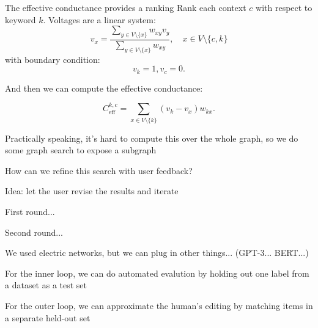 \documentclass[12pt]{beamer}
\begin{document}
\begin{frame}{The effective conductance provides a ranking}
  Rank each context $c$ with respect to keyword $k$. Voltages are a linear system:
  \begin{equation}
    v_x = \frac{\sum_{y \in V\setminus \{x\}} w_{xy}v_y}{\sum_{y \in V\setminus \{x\}} w_{xy}}, \quad x \in V \setminus \{c, k\}
  \end{equation}
  with boundary condition:
  \begin{equation}
    v_k = 1, v_c = 0.
  \end{equation}

  And then we can compute the effective conductance:
  
  \begin{equation}
    C_{\textrm{eff}}^{k,c} = \sum_{x \in V \setminus \{k\}} (v_k - v_x) w_{kx}.
  \end{equation}
\end{frame}

\begin{frame}{}
  Practically speaking, it's hard to compute this over the whole graph, so we do some graph search to expose a subgraph
\end{frame}

\begin{frame}{}
  How can we refine this search with user feedback?
\end{frame}

\begin{frame}{}
  Idea: let the user revise the results and iterate
\end{frame}

\begin{frame}{}
  First round...
\end{frame}

\begin{frame}{}
  Second round...
\end{frame}

\begin{frame}{}
  We used electric networks, but we can plug in other things... (GPT-3... BERT...)
\end{frame}

\begin{frame}{}
  For the inner loop, we can do automated evalution by holding out one label from a dataset as a test set
\end{frame}

\begin{frame}{}
  For the outer loop, we can approximate the human's editing by matching items in a separate held-out set
\end{frame}
\end{document}
